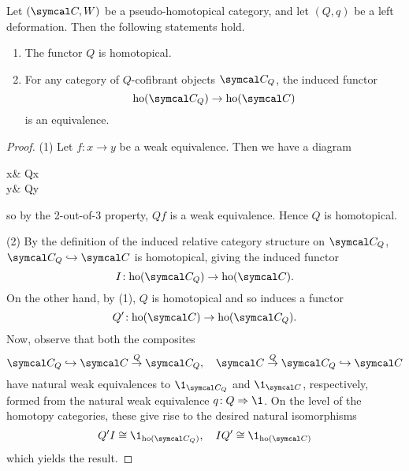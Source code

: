 \begin{proposition}\label{prop:deformation-is-homotopical-and-cofibrant-objects-homotopy-equivalence}
	Let \((\calC,W)\) be a pseudo-homotopical category, and let \((Q,q)\) be a left deformation. Then the following statements hold.
	\begin{enumerate}[label=(\arabic*)]
	\item The functor \(Q\) is homotopical.
	\item For any category of \(Q\)-cofibrant objects \(\calC_Q\), the induced functor
	\[ \ho(\calC_Q) \to \ho(\calC) \]
	is an equivalence.
	\end{enumerate}
\end{proposition}
\begin{proof}
(1) Let \(f\!:x\to y\) be a weak equivalence. Then we have a diagram
\begin{diagram*}
	x\ar[r,"q_x"]\ar[d,"f"'] & Qx\ar[d,"Qf"] \\
	y\ar[r,"q_y"] & Qy
\end{diagram*}
so by the 2-out-of-3 property, \(Qf\) is a weak equivalence. Hence \(Q\) is homotopical.

(2) By the definition of the induced relative category structure on \(\calC_Q\), \(\calC_Q\inj\calC\) is homotopical, giving the induced functor
\[ I\!:\ho(\calC_Q)\to\ho(\calC). \]
On the other hand, by (1), \(Q\) is homotopical and so induces a functor
\[ Q'\!:\ho(\calC)\to\ho(\calC_Q). \]
Now, observe that both the composites
\[ \calC_Q\inj\calC\overset{Q}\to\calC_Q,\quad \calC\overset{Q}\to\calC_Q\inj\calC \]
have natural weak equivalences to \(\1_{\calC_Q}\) and \(\1_{\calC}\), respectively, formed from the natural weak equivalence \(q\!:Q\To\1\). On the level of the homotopy categories,
these give rise to the desired natural isomorphisms
\[ Q'I\cong\1_{\ho(\calC_Q)},\quad IQ'\cong\1_{\ho(\calC)} \]
which yields the result.
\end{proof}

